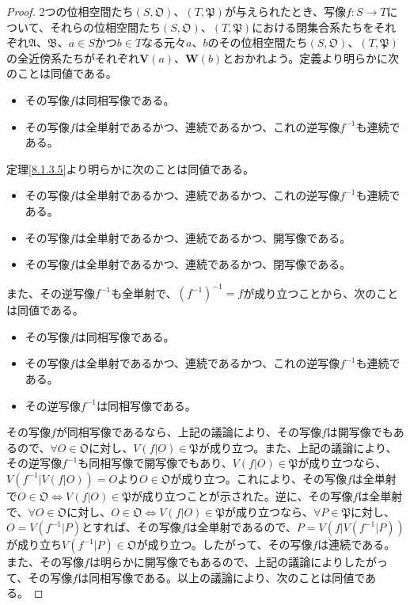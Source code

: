 \documentclass[dvipdfmx]{jsarticle}
\begin{document}
\begin{proof}
2つの位相空間たち$\left( S,\mathfrak{O} \right)$、$\left( T,\mathfrak{P} \right)$が与えられたとき、写像$f:S \rightarrow T$について、それらの位相空間たち$\left( S,\mathfrak{O} \right)$、$\left( T,\mathfrak{P} \right)$における閉集合系たちをそれぞれ$\mathfrak{A}$、$\mathfrak{B}$、$a \in S$かつ$b \in T$なる元々$a$、$b$のその位相空間たち$\left( S,\mathfrak{O} \right)$、$\left( T,\mathfrak{P} \right)$の全近傍系たちがそれぞれ$\mathbf{V}(a)$、$\mathbf{W}(b)$とおかれよう。定義より明らかに次のことは同値である。
\begin{itemize}
\item
  その写像$f$は同相写像である。
\item
  その写像$f$は全単射であるかつ、連続であるかつ、これの逆写像$f^{- 1}$も連続である。
\end{itemize}
定理\ref{8.1.3.5}より明らかに次のことは同値である。
\begin{itemize}
\item
  その写像$f$は全単射であるかつ、連続であるかつ、これの逆写像$f^{- 1}$も連続である。
\item
  その写像$f$は全単射であるかつ、連続であるかつ、開写像である。
\item
  その写像$f$は全単射であるかつ、連続であるかつ、閉写像である。
\end{itemize}
また、その逆写像$f^{- 1}$も全単射で、$\left( f^{- 1} \right)^{- 1} = f$が成り立つことから、次のことは同値である。
\begin{itemize}
\item
  その写像$f$は同相写像である。
\item
  その写像$f$は全単射であるかつ、連続であるかつ、これの逆写像$f^{- 1}$も連続である。
\item
  その逆写像$f^{- 1}$は同相写像である。
\end{itemize}\par
その写像$f$が同相写像であるなら、上記の議論により、その写像$f$は開写像でもあるので、$\forall O \in \mathfrak{O}$に対し、$V\left( f|O \right)\in \mathfrak{P}$が成り立つ。また、上記の議論により、その逆写像$f^{- 1}$も同相写像で開写像でもあり、$V\left( f|O \right)\in \mathfrak{P}$が成り立つなら、$V\left( f^{- 1}|V\left( f|O \right) \right) = O$より$O\in \mathfrak{O}$が成り立つ。これにより、その写像$f$は全単射で$O \in \mathfrak{O \Leftrightarrow}V\left( f|O \right)\in \mathfrak{P}$が成り立つことが示された。逆に、その写像$f$は全単射で、$\forall O \in \mathfrak{O}$に対し、$O \in \mathfrak{O \Leftrightarrow}V\left( f|O \right)\in \mathfrak{P}$が成り立つなら、$\forall P \in \mathfrak{P}$に対し、$O = V\left( f^{- 1}|P \right)$とすれば、その写像$f$は全単射であるので、$P = V\left( f|V\left( f^{- 1}|P \right) \right)$が成り立ち$V\left( f^{- 1}|P \right) \in \mathfrak{O}$が成り立つ。したがって、その写像$f$は連続である。また、その写像$f$は明らかに開写像でもあるので、上記の議論によりしたがって、その写像$f$は同相写像である。以上の議論により、次のことは同値である。

\end{proof}
\end{document}
